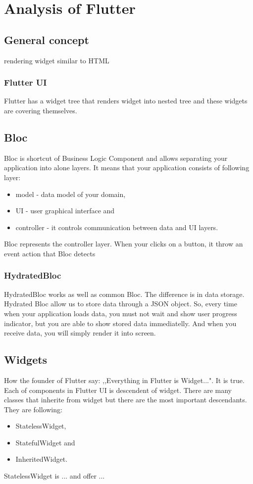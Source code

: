 \chapter{Analysis of Flutter}

\section{General concept}
rendering widget similar to HTML

\subsection{Flutter UI}
Flutter has a widget tree that renders widget into nested tree and these widgets are covering themselves.

\section{Bloc}
Bloc is shortcut of Business Logic Component and allows separating your application into alone layers. It means that your application consists of following layer:
\begin{itemize}
    \item model - data model of your domain,
    \item UI - user graphical interface and 
    \item controller - it controls communication between data and UI layers.
\end{itemize}
Bloc represents the controller layer. When your clicks on a button, it throw an event action that Bloc detects 

\subsection{HydratedBloc}
HydratedBloc works as well as common Bloc. The difference is in data storage. Hydrated Bloc allow us to store data through a JSON object. So, every time when your application loads data, you must not wait and show user progress indicator, but you are able to show stored data immediatelly. And when you receive data, you will simply render it into screen.

\section{Widgets}
How the founder of Flutter say: ,,Everything in Flutter is Widget...". It is true. Each of components in Flutter UI is descendent of widget. There are many classes that inherite from widget but there are the most important descendants. They are following:
\begin{itemize}
    \item StatelessWidget,
    \item StatefulWidget and
    \item InheritedWidget.
\end{itemize}{}
StatelessWidget is ... and offer ... \cite{statelessWidget}

